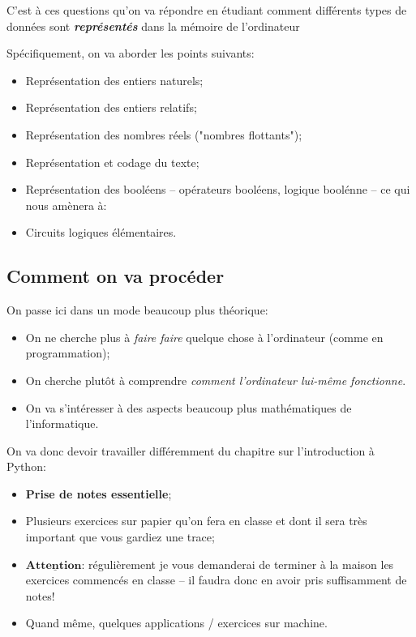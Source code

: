 \documentclass[12pt]{article}
\begin{document}
	C'est à ces questions qu'on va répondre en étudiant comment différents types de données sont \textbf{\textit{représentés}} dans la mémoire de l'ordinateur
	
	Spécifiquement, on va aborder les points suivants:
	\begin{itemize}
		\item Représentation des entiers naturels;
		\item Représentation des entiers relatifs;
		\item Représentation des nombres réels ("nombres flottants");
		\item Représentation et codage du texte;
		\item Représentation des booléens -- opérateurs booléens, logique boolénne -- ce qui nous amènera à:
		\item Circuits logiques élémentaires.
	\end{itemize}
	
	\subsection{Comment on va procéder}
	On passe ici dans un mode beaucoup plus théorique:
	\begin{itemize}
		\item On ne cherche plus à \textit{faire faire} quelque chose à l'ordinateur (comme en programmation);
		\item On cherche plutôt à comprendre \textit{comment l'ordinateur lui-même fonctionne}.
		\item On va s'intéresser à des aspects beaucoup plus mathématiques de l'informatique.
	\end{itemize}
	\vspace{\baselineskip}
	On va donc devoir travailler différemment du chapitre sur l'introduction à Python:
	 \begin{itemize}
	 	\item \textbf{Prise de notes essentielle};
	 	\item Plusieurs exercices sur papier qu'on fera en classe et dont il sera très important que vous gardiez une trace;
	 	\item $\underline{\textbf{Attention:}}$ régulièrement je vous demanderai de terminer à la maison les exercices commencés en classe -- il faudra donc en avoir pris suffisamment de notes!
	 	\item Quand même, quelques applications / exercices sur machine.
	 \end{itemize}
	 
\end{document}
